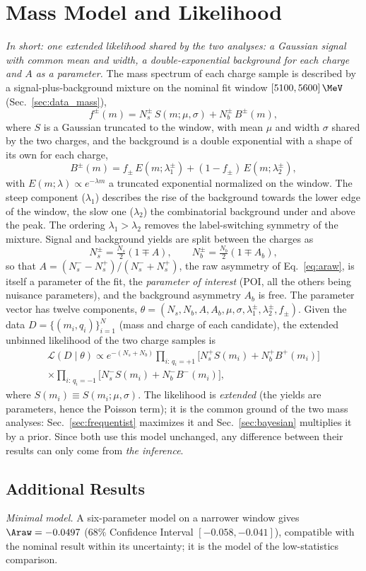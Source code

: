 \section{Mass Model and Likelihood}
\label{sec:model}
\label{sec:bayes_model}
\emph{In short: one extended likelihood shared by the two analyses: a Gaussian signal with common mean and width, a double-exponential background for each charge and $A$ as a parameter.}
The mass spectrum of each charge sample is described by a signal-plus-background mixture on the nominal fit window $[5100,5600]\,\MeV$ (Sec.~\ref{sec:data_mass}),
\begin{equation}
f^{\pm}(m)=N_s^{\pm}\,S(m;\mu,\sigma)+N_b^{\pm}\,B^{\pm}(m),
\label{eq:mixture}
\end{equation}
where $S$ is a Gaussian truncated to the window, with mean $\mu$ and width $\sigma$ shared by the two charges, and the background is a double exponential with a shape of its own for each charge,
\[
B^{\pm}(m)=f_{\pm}\,E(m;\lambda_{1}^{\pm})+(1-f_{\pm})\,E(m;\lambda_{2}^{\pm}),
\]
with $E(m;\lambda)\propto e^{-\lambda m}$ a truncated exponential normalized on the window. The steep component ($\lambda_1$) describes the rise of the background towards the lower edge of the window, the slow one ($\lambda_2$) the combinatorial background under and above the peak. The ordering $\lambda_1>\lambda_2$ removes the label-switching symmetry of the mixture. Signal and background yields are split between the charges as
\[
N_s^{\pm}=\tfrac{N_s}{2}(1\mp A),\qquad N_b^{\pm}=\tfrac{N_b}{2}(1\mp A_b),
\]
so that $A=(N_s^--N_s^+)/(N_s^-+N_s^+)$, the raw asymmetry \Araw of Eq.~\eqref{eq:araw}, is itself a parameter of the fit, the \emph{parameter of interest} (POI, all the others being nuisance parameters), and the background asymmetry $A_b$ is free. The parameter vector has twelve components, $\theta=(N_s,N_b,A,A_b,\mu,\sigma,\lambda_1^{\pm},\lambda_2^{\pm},f_{\pm})$.
Given the data $D=\{(m_i,q_i)\}_{i=1}^{N}$ (mass and charge of each candidate), the extended unbinned likelihood of the two charge samples is
\begin{multline}
\mathcal{L}(D\mid\theta)\propto e^{-(N_s+N_b)}
\prod_{i:\,q_i=+1}\Big[N_s^{+}S(m_i)+N_b^{+}B^{+}(m_i)\Big] \\
\times\prod_{i:\,q_i=-1}\Big[N_s^{-}S(m_i)+N_b^{-}B^{-}(m_i)\Big],
\label{eq:likelihood}
\end{multline}
where $S(m_i)\equiv S(m_i;\mu,\sigma)$. The likelihood is \emph{extended} (the yields are parameters, hence the Poisson term); it is the common ground of the two mass analyses: Sec.~\ref{sec:frequentist} maximizes it and Sec.~\ref{sec:bayesian} multiplies it by a prior. Since both use this model unchanged, any difference between their results can only come from \emph{the inference}.
\subsection{Additional Results}
\emph{Minimal model.} A six-parameter model on a narrower window gives $\Araw=-0.0497$ ($68\%$ Confidence Interval $[-0.058,-0.041]$), compatible with the nominal result within its uncertainty; it is the model of the low-statistics comparison.
